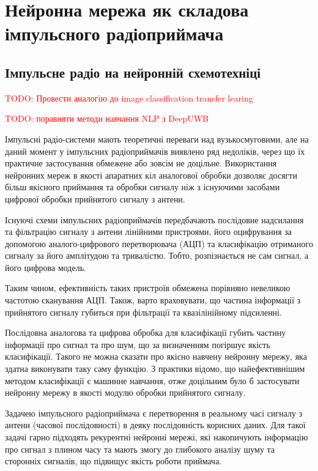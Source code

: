 \chapter{Нейронна мережа як складова імпульсного радіоприймача}
\label{ch:neuron}

\section{Імпульсне радіо на нейронній схемотехніці}

\textcolor{red}{TODO: Провести аналогію до image classification transfer 
learing}

\textcolor{red}{TODO: поравняти методи навчання NLP з DeepUWB}

Імпульсні радіо-системи мають теоретичні переваги над вузькосмуговими, 
але на даний момент у імпульсних радіоприймачів виявлено ряд недоліків, 
через що їх практичне застосування обмежене або зовсім не доцільне. 
Використання нейронних мереж в якості апаратних кіл аналогової обробки 
дозволяє досягти більш якісного приймання та обробки сигналу ніж з 
існуючими засобами цифрової обробки прийнятого сигналу з антени.

Існуючі схеми імпульсних радіоприймачів передбачають послідовне надсилання 
та фільтрацію сигналу з антени лінійними пристроями, його оцифрування за 
допомогою аналого-цифрового перетворювача (АЦП) та класифікацію отриманого 
сигналу за його амплітудою та тривалістю. Тобто, розпізнається не сам сигнал, 
а його цифрова модель.

Таким чином, ефективність таких пристроїв обмежена порівняно невеликою 
частотою сканування  АЦП. Також, варто враховувати, що частина інформації 
з прийнятого сигналу губиться при фільтрації та квазілінійному підсиленні.

Послідовна аналогова та цифрова обробка для класифікації губить частину 
інформації про сигнал та про шум, що за визначенням погіршує якість 
класифікації. Такого не можна сказати про якісно навчену нейронну мережу, 
яка здатна виконувати таку саму функцію. З практики відомо, що 
найефективнішим методом класифікації є машинне навчання, отже доцільним 
було б застосувати нейронну мережу в якості модулю обробки прийнятого 
сигналу. 

Задачею імпульсного радіоприймача є перетворення в реальному часі сигналу 
з антени (часової послідовності) в деяку послідовність корисних даних. 
Для такої задачі гарно підходять рекурентні нейронні мережі, які накопичують 
інформацію про сигнал з плином часу та мають змогу до глибокого аналізу шуму 
та сторонніх сигналів, що підвищує якість роботи приймача.

